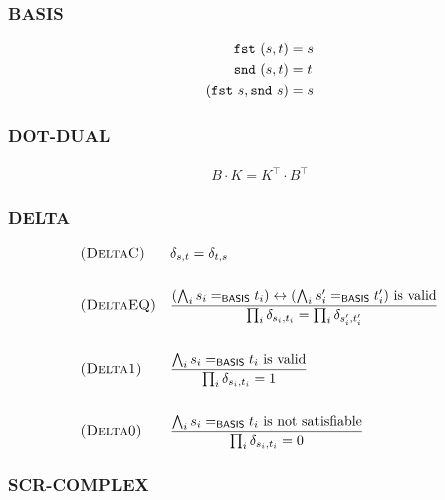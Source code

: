 
\subsubsection*{\textsf{BASIS}}
\begin{align*}
    \texttt{fst}\ (s, t) & = s \\
    \texttt{snd}\ (s, t)& = t \\
    (\texttt{fst}\ s, \texttt{snd}\ s) & = s
\end{align*}

\subsubsection*{\textsf{DOT-DUAL}}
\begin{align*}
    B \cdot K = K^\top \cdot B^\top
\end{align*}

\subsubsection*{\textsf{DELTA}}
\begin{align*}
    & \textsc{(DeltaC)} && \delta_{s, t} = \delta_{t, s} \\
    \\
    & \textsc{(DeltaEQ)} && \frac{(\bigwedge_i s_i =_\textsf{BASIS} t_i) \leftrightarrow (\bigwedge_i s_i' =_\textsf{BASIS} t_i') \textrm{ is valid}}{\prod_i \delta_{s_i, t_i} = \prod_i \delta_{s_i', t_i'}} \\
    \\
    & \textsc{(Delta1)} && 
    \frac{\bigwedge_i s_i =_\textsf{BASIS} t_i \textrm{ is valid}}{ \prod_i \delta_{s_i, t_i} = 1}
    \\
    \\
    & \textsc{(Delta0)} && 
    \frac{\bigwedge_i s_i =_\textsf{BASIS} t_i \textrm{ is not satisfiable}}{ \prod_i \delta_{s_i, t_i} = 0}
\end{align*}
  
\subsubsection*{\textsf{SCR-COMPLEX}}

